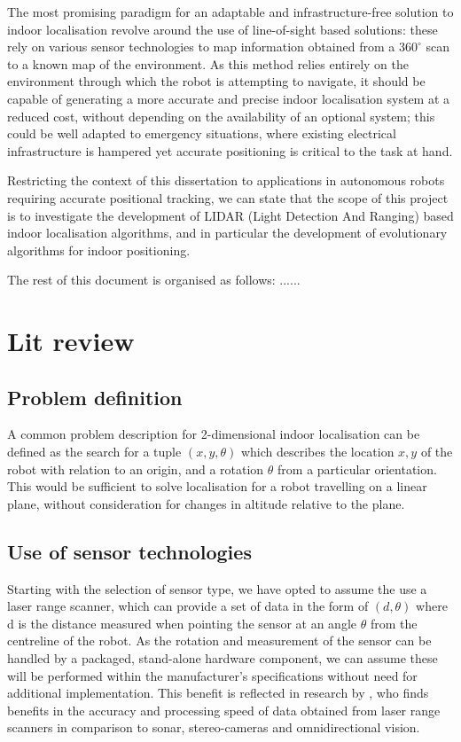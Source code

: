 \documentclass[authoryearcitations]{UoYCSproject}
\begin{document}
The most promising paradigm for an adaptable and infrastructure-free solution to indoor localisation revolve around the use of line-of-sight based solutions: these rely on various sensor technologies to map information obtained from a  $360^{\circ}$ scan to a known map of the environment. As this method relies entirely on the environment through which the robot is attempting to navigate, it should be capable of generating a more accurate and precise indoor localisation system at a reduced cost, without depending on the availability of an optional system; this could be well adapted to emergency situations, where existing electrical infrastructure is hampered yet accurate positioning is critical to the task at hand. 

Restricting the context of this dissertation to applications in autonomous robots requiring accurate positional tracking, we can state that the scope of this project is to investigate the development of LIDAR (Light Detection And Ranging) based indoor localisation algorithms, and in particular the development of evolutionary algorithms for indoor positioning.

The rest of this document is organised as follows: ...... 
\chapter{Lit review}

\section{Problem definition}
A common problem description for 2-dimensional indoor localisation can be defined as the search for a tuple $(x, y, \theta)$ which describes the location $x, y$ of the robot with relation to an origin, and a rotation $\theta$ from a particular orientation. This would be sufficient to solve localisation for a robot travelling on a linear plane, without consideration for changes in altitude relative to the plane.


\section{Use of sensor technologies}
Starting with the selection of sensor type, we have opted to assume the use a laser range scanner, which can provide a set of data in the form of $(d, \theta)$ where d is the distance measured when pointing the sensor at an angle $\theta$ from the centreline of the robot. As the rotation and measurement of the sensor can be handled by a packaged, stand-alone hardware component, we can assume these will be performed within the manufacturer's specifications without need for additional implementation. This benefit is reflected in research by \citet{Lingemann2005-hm}, who finds benefits in the accuracy and processing speed of data obtained from laser range scanners in comparison to sonar, stereo-cameras and omnidirectional vision.
\end{document}
